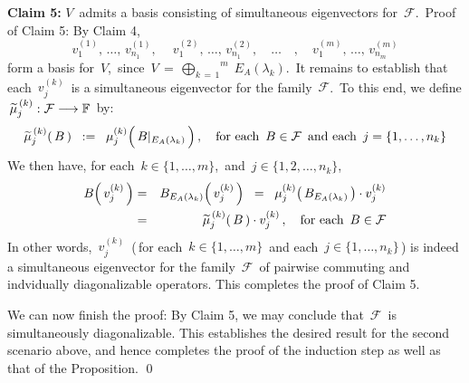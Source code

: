 \begin{enumerate}
    \vskip 0.3cm
    \noindent
    \textbf{Claim 5:}\;
    $V$\, admits a basis consisting of simultaneous eigenvectors for \,$\mathcal{F}$.\,
    \vskip -0.01cm
    \noindent
    Proof of Claim 5:\;
    By Claim 4,
    \begin{equation*}
    v^{(1)}_{1},\, \ldots,\, v^{(1)}_{n_{1}},
    \quad\
    v^{(2)}_{1},\, \ldots,\, v^{(2)}_{n_{1}},
    \quad
    \ldots\quad,
    \quad
    v^{(m)}_{1},\, \ldots,\, v^{(m)}_{n_{m}}
    \end{equation*}
    form a basis for \,$V$,\, since
    \,$V \,=\, \overset{m}{\underset{k\,=\,1}{\bigoplus}}\;E_{A}(\lambda_{k})$.\,
    It remains to establish that each \,$v^{(k)}_{j}$\, is a simultaneous eigenvector
    for the family \,$\mathcal{F}$.\,
    To this end, we define
    \,$\widetilde{\mu}^{\,(k)}_{j} : \mathcal{F} \longrightarrow \mathbb{F}$\,
    by:
    \begin{equation*}
    \widetilde{\mu}^{\,(k)}_{j}\!\left(\,B\,\right)
    \;\; := \;\;
        \mu^{(k)}_{j}\!\left(\,\overset{{\color{white}.}}{B\vert_{E_{A}(\lambda_{k})}}\,\right),
    \quad
    \textnormal{for each \,$B \in \mathcal{F}$\, and each \,$j = \{1,\ldots,n_{k}\}$}
    \end{equation*}
    We then have, for each
    \,$k \in \{1,\ldots,m\}$,\, and
    \,$j \in \{1, 2, \ldots, n_{k}\}$,
    \begin{eqnarray*}
    B\!\left(\,v^{(k)}_{j}\,\right)
    & = &
        B_{E_{A}(\lambda_{k})}\!\left(\,v^{(k)}_{j}\,\right)
    \;\; = \;\;
        \mu^{(k)}_{j}\!\left(\,B_{E_{A}(\lambda_{k})}\,\right) \cdot v^{(k)}_{j}
    \\
    & = &
        \widetilde{\mu}^{\,(k)}_{j}\!\left(\,B\,\right) \cdot v^{(k)}_{j}\,,
    \quad
    \textnormal{for each \,$B \in \mathcal{F}$}
    \end{eqnarray*}
    In other words, \,$v^{(k)}_{j}$\,
    (\,for each \,$k \in \{1,\ldots,m\}$\, and each \,$j \in \{1,\ldots,n_{k}\}$\,)
    is indeed a simultaneous eigenvector for the family \,$\mathcal{F}$\,
    of pairwise commuting and indvidually diagonalizable operators.
    This completes the proof of Claim 5.

    \vskip 0.3cm
    We can now finish the proof: By Claim 5, we may conclude that
    \,$\mathcal{F}$\, is simultaneously diagonalizable.
    This establishes the desired result for the second scenario above, and hence
    completes the proof of the induction step as well as that of the Proposition.
    \qed
\end{enumerate}

